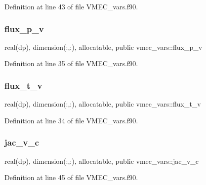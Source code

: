 Definition at line 43 of file V\+M\+E\+C\+\_\+vars.\+f90.

\mbox{\label{namespacevmec__vars_aeac5e1262f419b7ae674586f576dc928}} 
\subsubsection{\texorpdfstring{flux\+\_\+p\+\_\+v}{flux\_p\_v}}
{\footnotesize\ttfamily real(dp), dimension(\+:,\+:), allocatable, public vmec\+\_\+vars\+::flux\+\_\+p\+\_\+v}



Definition at line 35 of file V\+M\+E\+C\+\_\+vars.\+f90.

\mbox{\label{namespacevmec__vars_ac246a5937702b1ac4c7f9bd92d286766}} 
\subsubsection{\texorpdfstring{flux\+\_\+t\+\_\+v}{flux\_t\_v}}
{\footnotesize\ttfamily real(dp), dimension(\+:,\+:), allocatable, public vmec\+\_\+vars\+::flux\+\_\+t\+\_\+v}



Definition at line 34 of file V\+M\+E\+C\+\_\+vars.\+f90.

\mbox{\label{namespacevmec__vars_adcce7c5969ef8c35e8f9673ca0fed8da}} 
\subsubsection{\texorpdfstring{jac\+\_\+v\+\_\+c}{jac\_v\_c}}
{\footnotesize\ttfamily real(dp), dimension(\+:,\+:), allocatable, public vmec\+\_\+vars\+::jac\+\_\+v\+\_\+c}



Definition at line 45 of file V\+M\+E\+C\+\_\+vars.\+f90.

\mbox{\label{namespacevmec__vars_a633a5542080c02fe2072a6643568562b}} 
